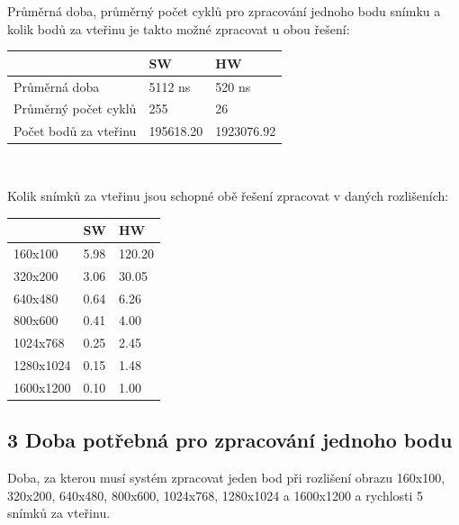 \documentclass[12pt,a4paper]{article}
\begin{document}
\begin{multicols}{2}
	\noindent
	Průměrná doba, průměrný počet cyklů pro zpracování jednoho bodu snímku a
	kolik bodů za vteřinu je takto možné zpracovat u obou řešení:
	\vspace*{0.2cm}
	\begin{center}
		\begin{tabular}{| l | l | l |}
		\hline
		 & SW & HW \\
		\hline
		Průměrná doba & 5112 ns & 520 ns \\
		Průměrný počet cyklů & 255 & 26 \\
		Počet bodů za vteřinu & 195618.20 & 1923076.92 \\
		\hline
		\end{tabular}
	\end{center}

	$ $ \newline

	\noindent
	Kolik snímků za vteřinu jsou schopné obě řešení zpracovat v daných rozlišeních:
	\vspace*{0.2cm}
	\begin{center}
		\begin{tabular}{| l | l | l |}
		\hline
		 & SW & HW \\
		\hline
		160x100 & 5.98 & 120.20 \\
		320x200 & 3.06 & 30.05 \\
		640x480 & 0.64 & 6.26 \\
		800x600 & 0.41 & 4.00 \\
		1024x768 & 0.25 & 2.45 \\
		1280x1024 & 0.15 & 1.48 \\
		1600x1200 & 0.10 & 1.00 \\
		\hline
		\end{tabular}
	\end{center}
\end{multicols}

\subsection*{3 Doba potřebná pro zpracování jednoho bodu}

Doba, za kterou musí systém zpracovat jeden bod při rozlišení obrazu 160x100, 320x200,
640x480, 800x600, 1024x768, 1280x1024 a 1600x1200 a rychlosti 5 snímků za vteřinu.
\end{document}
